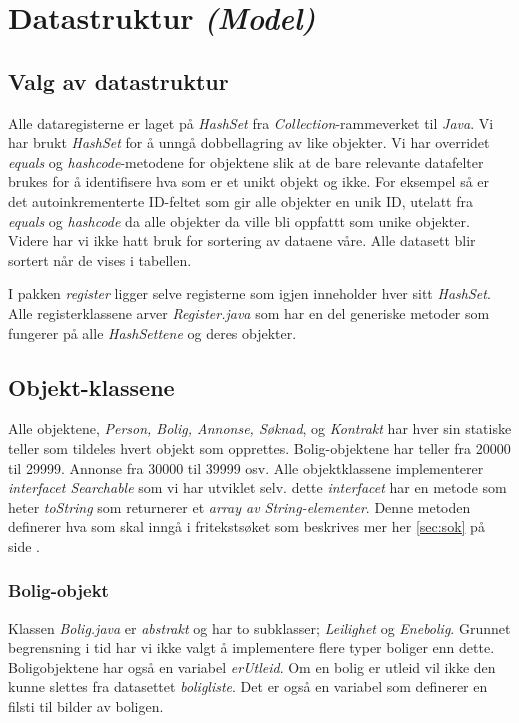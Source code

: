 \section{Datastruktur \emph{(Model)}} \label{sec:Datastruktur}

\subsection{Valg av datastruktur}
Alle dataregisterne er laget på \emph{HashSet} fra \emph{Collection}-rammeverket til \emph{Java}. Vi har brukt \emph{HashSet} for å unngå dobbellagring av like objekter. Vi har overridet \emph{equals} og \emph{hashcode}-metodene for objektene slik at de bare relevante datafelter brukes for å identifisere hva som er et unikt objekt og ikke. For eksempel så er det autoinkrementerte ID-feltet som gir alle objekter en unik ID, utelatt fra \emph{equals} og \emph{hashcode} da alle objekter da ville bli oppfattt som unike objekter.
Videre har vi ikke hatt bruk for sortering av dataene våre. Alle datasett blir sortert når de vises i tabellen.

I pakken \emph{register} ligger selve registerne som igjen inneholder hver sitt \emph{HashSet}. Alle registerklassene arver \emph{Register.java} som har en del generiske metoder som fungerer på alle \emph{HashSettene} og deres objekter.

\subsection{Objekt-klassene}
Alle objektene, \emph{Person, Bolig, Annonse, Søknad}, og \emph{Kontrakt} har hver sin statiske teller som tildeles hvert objekt som opprettes. Bolig-objektene har teller fra 20000 til 29999. Annonse fra 30000 til 39999 osv.
Alle objektklassene implementerer \emph{interfacet Searchable} som vi har utviklet selv. dette \emph{interfacet} har en metode som heter \emph{toString} som returnerer et \emph{array av String-elementer}. Denne metoden definerer hva som skal inngå i fritekstsøket som beskrives mer her \ref{sec:sok} på side \pageref{sec:sok}.

\subsubsection{Bolig-objekt}
Klassen \emph{Bolig.java} er \emph{abstrakt} og har to subklasser; \emph{Leilighet} og \emph{Enebolig}. Grunnet begrensning i tid har vi ikke valgt å implementere flere typer boliger enn dette.
Boligobjektene har også en variabel \emph{erUtleid}. Om en bolig er utleid vil ikke den kunne slettes fra datasettet \emph{boligliste}.
Det er også en variabel som definerer en filsti til bilder av boligen. 


